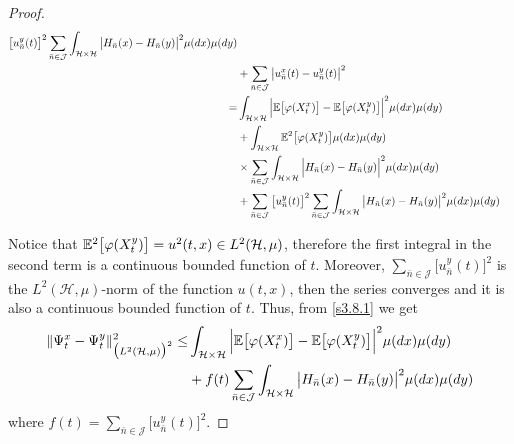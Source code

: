 \documentclass[review, onefignum, onetabnum]{siamart171218}
\begin{document}
\begin{proof}
\begin{equation}
\begin{aligned}
            \big[
                u_{\bar n}^y(t)
            \big] ^ 2
            \sum_{\bar n\in \mathcal{J}}
            \int_{\mathcal{H}\times \mathcal{H}}
            \big|
                H_{\bar n}(x) -H_{\bar n}(y)
            \big|^2 \mu(dx) \mu(dy)
            \\
            &+
            \sum_{\bar n\in \mathcal{J}}
                        \big|
                            u_{\bar n}^x(t)-u_{\bar n}^y(t)
                        \big| ^ 2
            \\
            =&
            \int_{\mathcal{H}\times \mathcal{H}}
            \Big|
                \mathbb{E}\big[
                    \varphi(X_t^x)
                \big]
                -
                \mathbb{E}\big[
                    \varphi(X_t^y)
                \big]
            \Big|^2
            \mu(dx)\mu(dy)
            \\
            &+
            \int_{\mathcal{H}\times \mathcal{H}}
            \mathbb{E} ^ 2\big[
                \varphi(X_t^y)
            \big] \mu(dx) \mu(dy)
            \\
            & \times
            \sum_{\bar n\in \mathcal{J}}
            \int_{\mathcal{H}\times \mathcal{H}}
            \Big|
                H_{\bar n}(x) - H_{\bar n}(y)
            \Big|^2  \mu(dx)\mu(dy)
            \\
            &+
            \sum_{\bar n\in \mathcal{J}}
            \big[
                u_{\bar n}^y(t)
            \big]^2
            \sum_{\bar n\in \mathcal{J}}
            \int_{\mathcal{H}\times \mathcal{H}}
            \big|
                H_{\bar n}(x) - H_{\bar n}(y)
            \big|^2 \mu(dx)\mu(dy)
    \end{aligned}
\end{equation}

    Notice that
$\mathbb{E}^2\big[\varphi(X_t^y)\big]=u^2(t,x)\in L^2(\mathcal{H},\mu)$,
therefore the first integral in the second term is a continuous bounded
function of $t$. Moreover,
$\sum_{\bar n\in \mathcal{J}} \big[u_{\bar n}^y(t)\big]^2$ is the
$L^2(\mathcal{H},\mu)$-norm of the function $u(t,x)$, then the series
converges and it is also a continuous bounded function of $t$. Thus, from
\eqref{s3.8.1} we get
%
\begin{equation}
\label{s3.9.1}
    \begin{aligned}
        \| \Psi_t^x-\Psi_t^y\|_{\big(L^2(\mathcal{H},\mu) \big)^2}^2
        \le&
        \int_{\mathcal{H}\times \mathcal{H}}
            \Big|
                \E\big [
                    \varphi(X_t^x)
                \big
                ]-
                \E\big[
                    \varphi(X_t^y)
                \big]
            \Big|^2
        \mu(dx)\mu(dy)
        \\
         &+
         f(t)
         \sum_{\bar n\in \mathcal{J}}
         \int_{\mathcal{H}\times \mathcal{H}}
            \big|
                H_{\bar n}(x) - H_{\bar n}(y)
            \big|^2 \mu(dx)\mu(dy)
    \end{aligned}
\end{equation}
where $f(t)= \sum_{\bar n\in \mathcal{J}} \big[u_{\bar n}^y(t)\big]^2$.


\end{proof}
\end{document}
